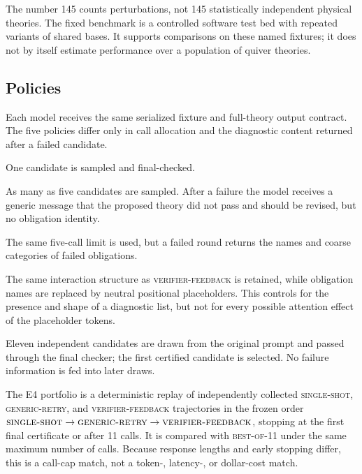\documentclass[11pt]{scrartcl}
\newcommand{\ssarm}{\textsc{single-shot}}
\newcommand{\grarm}{\textsc{generic-retry}}
\newcommand{\vfarm}{\textsc{verifier-feedback}}
\newcommand{\maskedarm}{\textsc{masked-feedback}}
\newcommand{\bonarm}{\textsc{best-of-11}}
\begin{document}
The number 145 counts perturbations, not 145 statistically independent physical
theories.  The fixed benchmark is a controlled software test bed with repeated
variants of shared bases.  It supports comparisons on these named fixtures; it
does not by itself estimate performance over a population of quiver theories.

\subsection{Policies}
\label{sec:policies}

Each model receives the same serialized fixture and full-theory output contract.
The five policies differ only in call allocation and the diagnostic content
returned after a failed candidate.

\begin{description}[leftmargin=3.2cm,style=nextline,itemsep=0.35em]
  \item[\ssarm.] One candidate is sampled and final-checked.
  \item[\grarm.] As many as five candidates are sampled.  After a failure the
  model receives a generic message that the proposed theory did not pass and
  should be revised, but no obligation identity.
  \item[\vfarm.] The same five-call limit is used, but a failed round returns
  the names and coarse categories of failed obligations.
  \item[\maskedarm.] The same interaction structure as \vfarm{} is retained,
  while obligation names are replaced by neutral positional placeholders.
  This controls for the presence and shape of a diagnostic list, but not for
  every possible attention effect of the placeholder tokens.
  \item[\bonarm.] Eleven independent candidates are drawn from the original
  prompt and passed through the final checker; the first certified candidate is
  selected.  No failure information is fed into later draws.
\end{description}

The E4 portfolio is a deterministic replay of independently collected
\ssarm{}, \grarm{}, and \vfarm{} trajectories in the frozen order
$\ssarm\rightarrow\grarm\rightarrow\vfarm$, stopping at the first final
certificate or after 11 calls.  It is compared with \bonarm{} under the same
maximum number of calls.  Because response lengths and early stopping differ,
this is a call-cap match, not a token-, latency-, or dollar-cost match.
\end{document}

